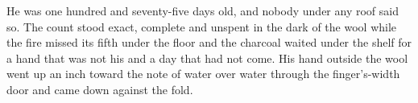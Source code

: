 He was one hundred and seventy-five days old, and nobody under any roof said so. The count stood exact, complete and unspent in the dark of the wool while the fire missed its fifth under the floor and the charcoal waited under the shelf for a hand that was not his and a day that had not come. His hand outside the wool went up an inch toward the note of water over water through the finger's-width door and came down against the fold.
